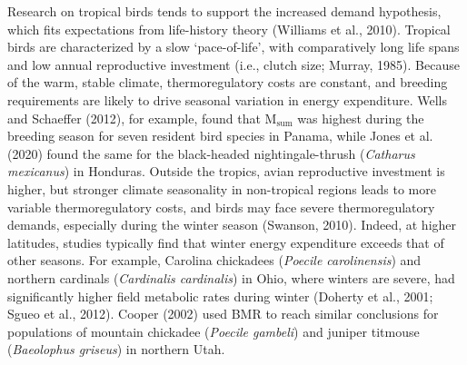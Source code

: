 \documentclass[10pt, twoside]{book} %
\begin{document}
Research on tropical birds tends to support the increased demand hypothesis, which fits expectations from life-history theory (Williams et al., 2010). Tropical birds are characterized by a slow ‘pace-of-life’, with comparatively long life spans and low annual reproductive investment (i.e., clutch size; Murray, 1985). Because of the warm, stable climate, thermoregulatory costs are constant, and breeding requirements are likely to drive seasonal variation in energy expenditure. Wells and Schaeffer (2012), for example, found that M$_{\text{sum}}$ was highest during the breeding season for seven resident bird species in Panama, while Jones et al. (2020) found the same for the black-headed nightingale-thrush (\textit{Catharus mexicanus}) in Honduras. Outside the tropics, avian reproductive investment is higher, but stronger climate seasonality in non-tropical regions leads to more variable thermoregulatory costs, and birds may face severe thermoregulatory demands, especially during the winter season (Swanson, 2010). Indeed, at higher latitudes, studies typically find that winter energy expenditure exceeds that of other seasons. For example, Carolina chickadees (\textit{Poecile carolinensis}) and northern cardinals (\textit{Cardinalis cardinalis}) in Ohio, where winters are severe, had significantly higher field metabolic rates during winter (Doherty et al., 2001; Sgueo et al., 2012). Cooper (2002) used BMR to reach similar conclusions for populations of mountain chickadee (\textit{Poecile gambeli}) and juniper titmouse (\textit{Baeolophus griseus}) in northern Utah.\\
\end{document}
